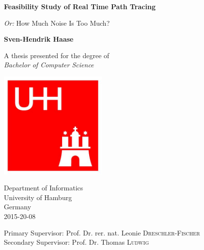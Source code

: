 \begin{titlepage}
    \begin{center}
        \Huge
        \textbf{Feasibility Study of Real Time Path Tracing}
        
        \vspace{0.5cm}

        \LARGE
        \textit{Or:} How Much Noise Is Too Much?
        
        \vspace{1.5cm}
        
        \textbf{Sven-Hendrik Haase}
        
        \vfill
        
        A thesis presented for the degree of\\
        \emph{Bachelor of Computer Science}
        
        \vspace{0.8cm}
        
        \includegraphics[width=0.4\textwidth]{frontbackmatter/logo_uhh.jpg}
        
        
        \Large
        Department of Informatics\\
        University of Hamburg\\
        Germany\\
        2015-20-08

        \vspace{0.8cm}

        \large
        Primary Supervisor: Prof. Dr. rer. nat. Leonie \textsc{Dreschler-Fischer}\\
        Secondary Supervisor: Prof. Dr. Thomas \textsc{Ludwig}
        
    \end{center}
\end{titlepage}
